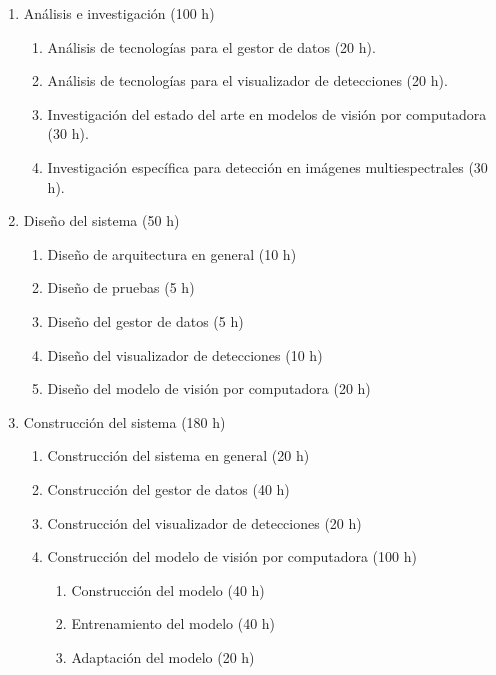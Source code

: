 \documentclass[
11pt, %
]{charter}
\begin{document}
\begin{enumerate}
  \item Análisis e investigación (100 h)
        \begin{enumerate}
          \item Análisis de tecnologías para el gestor de datos (20 h).
          \item Análisis de tecnologías para el visualizador de detecciones (20 h).
          \item Investigación del estado del arte en modelos de visión por computadora (30 h).
          \item Investigación específica para detección en imágenes multiespectrales (30 h).
        \end{enumerate}

  \item Diseño del sistema (50 h)
        \begin{enumerate}
          \item Diseño de arquitectura en general (10 h)
          \item Diseño de pruebas (5 h)
          \item Diseño del gestor de datos (5 h)
          \item Diseño del visualizador de detecciones (10 h)
          \item Diseño del modelo de visión por computadora (20 h)
        \end{enumerate}

  \item Construcción del sistema (180 h)
        \begin{enumerate}
          \item Construcción del sistema en general (20 h)
          \item Construcción del gestor de datos (40 h)
          \item Construcción del visualizador de detecciones (20 h)
          \item Construcción del modelo de visión por computadora (100 h)
                \begin{enumerate}[label*=\arabic*.]
                  \item Construcción del modelo (40 h)
                  \item Entrenamiento del modelo (40 h)
                  \item Adaptación del modelo (20 h)
                \end{enumerate}
        \end{enumerate}


\end{enumerate}
\end{document}
